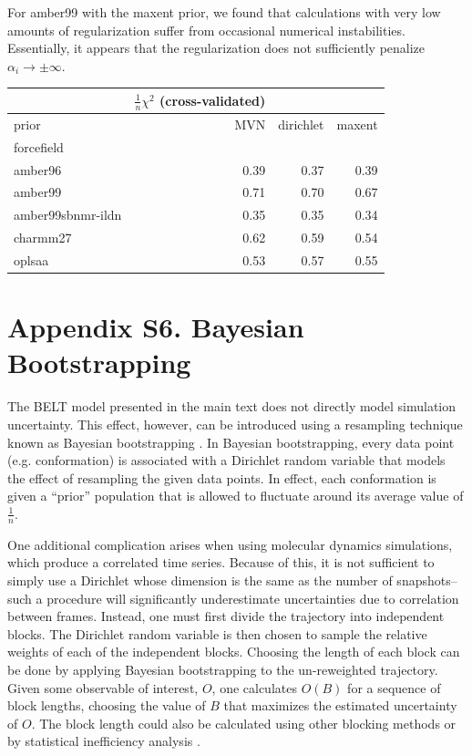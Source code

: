 \documentclass[12pt]{article}
\begin{document}
For amber99 with the maxent prior, we found that calculations with very low amounts of regularization suffer from occasional numerical instabilities.  Essentially, it appears that the regularization does not sufficiently penalize $\alpha_i \rightarrow \pm \infty$.

\vspace{5mm}


\begin{tabular}{lrrr}
\toprule
{} &  $\frac{1}{n}\chi^2$ (cross-validated) & &          \\
\midrule
prior &       MVN &  dirichlet & maxent  \\
forcefield        &           &  &       \\
amber96           &      0.39 &       0.37 &    0.39 \\
amber99           &      0.71 &       0.70 &    0.67 \\
amber99sbnmr-ildn &      0.35 &       0.35 &    0.34 \\
charmm27          &      0.62 &       0.59 &    0.54 \\
oplsaa            &      0.53 &       0.57 &    0.55 \\
\bottomrule
\end{tabular}

\newpage

\section*{Appendix S6.  Bayesian Bootstrapping}

The BELT model presented in the main text does not directly model simulation uncertainty.  This effect, however, can be introduced using a resampling technique known as Bayesian bootstrapping \cite{rubin1981}.  In Bayesian bootstrapping, every data point (e.g. conformation) is associated with a Dirichlet random variable that models the effect of resampling the given data points.  In effect, each conformation is given a ``prior'' population that is allowed to fluctuate around its average value of $\frac{1}{n}$.  

One additional complication arises when using molecular dynamics simulations, which produce a correlated time series.  Because of this, it is not sufficient to simply use a Dirichlet whose dimension is the same as the number of snapshots--such a procedure will significantly underestimate uncertainties due to correlation between frames.  Instead, one must first divide the trajectory into independent blocks.  The Dirichlet random variable is then chosen to sample the relative weights of each of the independent blocks.  Choosing the length of each block can be done by applying Bayesian bootstrapping to the un-reweighted trajectory.  Given some observable of interest, $O$, one calculates $O(B)$ for a sequence of block lengths, choosing the value of $B$ that maximizes the estimated uncertainty of $O$.  The block length could also be calculated using other blocking methods \cite{flyvbjerg1989error} or by statistical inefficiency analysis \cite{shirts2008}.  
\end{document}
